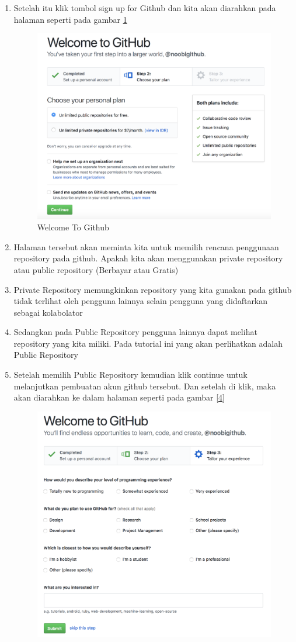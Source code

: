 \begin{enumerate}
\item Setelah itu klik tombol sign up for Github dan kita akan diarahkan pada halaman seperti pada gambar \ref{home}
\begin{figure}[!htbp]
\centerline{\includegraphics[width=.75\textwidth]{Figures/akunGit/3.PNG}}
\caption{Welcome To Github}
\label{home}
\end{figure}
\item Halaman tersebut akan meminta kita untuk memilih rencana penggunaan repository pada github. Apakah kita akan menggunakan private repository atau public repository (Berbayar atau Gratis)
\item Private Repository memungkinkan repository yang kita gunakan pada github tidak terlihat oleh pengguna lainnya selain pengguna yang didaftarkan sebagai kolabolator
\item Sedangkan pada Public Repository pengguna lainnya dapat melihat repository yang kita miliki. Pada tutorial ini yang akan perlihatkan adalah Public Repository
\item Setelah memilih Public Repository kemudian klik continue untuk melanjutkan pembuatan akun github tersebut. Dan setelah di klik, maka akan diarahkan ke dalam halaman seperti pada gambar \ref{4}
\begin{figure}[!htbp]
\centerline{\includegraphics[width=.75\textwidth]{Figures/akunGit/4.PNG}}

\end{figure}
\end{enumerate}
